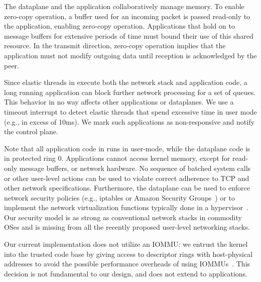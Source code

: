 The \ix dataplane and the application collaboratively manage
memory. To enable zero-copy operation, a buffer used for an incoming
packet is passed read-only to the application, enabling zero-copy
operation. Applications that hold on to message buffers for extensive
periods of time must bound their use of this shared resource.  In the
transmit direction, zero-copy operation implies that the application
must not modify outgoing data
until reception is
acknowledged by the peer. %

Since elastic threads in \ix execute both the network stack and
application code, a long running application can block further network
processing for a set of queues. This behavior in no way affects other
applications or dataplanes. We use a timeout interrupt to
detect elastic threads that spend excessive time in user mode (e.g.,
in excess of 10ms). We mark such applications as non-responsive and notify
the control plane. %

Note that all application code in \ix runs in user-mode, while the
dataplane code is in protected ring 0. Applications cannot access
kernel memory, except for read-only message buffers, or network
hardware.  No sequence of batched system calls or other user-level
actions can be used to violate correct adherence to TCP and other
network specifications.  Furthermore, the dataplane can be used to
enforce network security policies (e.g., iptables or Amazon Security
Groups~\cite{url:amazon-sg}) or to implement the network virtualization functions typically
done in a hypervisor~\cite{nsdi:nsx}. Our security model is as strong
as conventional network stacks in commodity OSes and is missing from all
the recently proposed user-level networking stacks.

Our current implementation does not utilize an IOMMU: we entrust
the \ix kernel into the trusted code base by giving access to
descriptor rings with host-physical addresses to avoid the possible
performance overheads of using IOMMUs~\cite{iommu_overhead}.  This
decision is not fundamental to our design, and does not extend to
applications.


